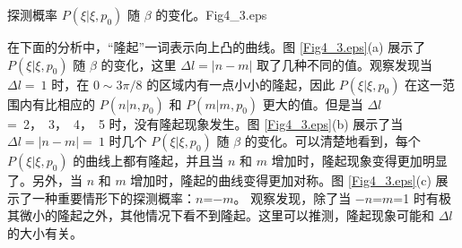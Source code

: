 \documentclass[master]{thesis-uestc}
\begin{document}

\begin{pics}[H]{探测概率 $P(\xi|\xi,p_0)$ 随 $\beta$ 的变化。}{Fig4_3.eps}
\end{pics}

在下面的分析中，“隆起”一词表示向上凸的曲线。图 \ref{Fig4_3.eps}(a) 展示了 $P(\xi|\xi,p_0)$ 随 $\beta$ 的变化，这里 $\Delta l=|n-m|$ 取了几种不同的值。观察发现当 $\Delta l=~1$ 时，在 $0\sim3\pi/8$ 的区域内有一点小小的隆起，因此 $P(\xi|\xi,p_0)$ 在这一范围内有比相应的 $P(n|n,p_0)$ 和 $P(m|m,p_0)$ 更大的值。但是当 $\Delta l$ =~2，~3，~4，~5 时，没有隆起现象发生。图 \ref{Fig4_3.eps}(b) 展示了当 $\Delta l=|n-m|=~1$ 时几个 $P(\xi|\xi,p_0)$ 随 $\beta$ 的变化。可以清楚地看到，每个 $P(\xi|\xi,p_0)$ 的曲线上都有隆起，并且当 $n$ 和 $m$ 增加时，隆起现象变得更加明显了。另外，当 $n$ 和 $m$ 增加时，隆起的曲线变得更加对称。图 \ref{Fig4_3.eps}(c) 展示了一种重要情形下的探测概率：$n$=$-m$。 观察发现，除了当 $-n$=$m$=1 时有极其微小的隆起之外，其他情况下看不到隆起。这里可以推测，隆起现象可能和 $\Delta l$ 的大小有关。
\end{document}
